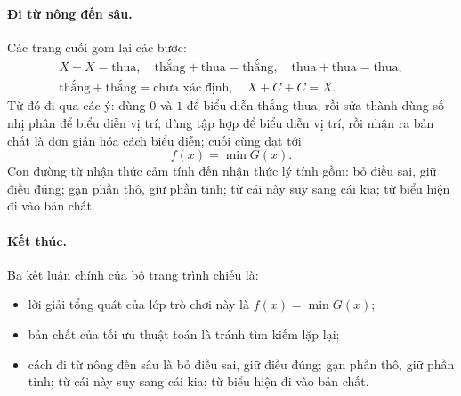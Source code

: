 \documentclass[11pt]{article}
\begin{document}
\paragraph{Đi từ nông đến sâu.}
Các trang cuối gom lại các bước:
\[
\begin{array}{c}
X+X=\text{thua},\quad
\text{thắng}+\text{thua}=\text{thắng},\quad
\text{thua}+\text{thua}=\text{thua},\\
\text{thắng}+\text{thắng}=\text{chưa xác định},\quad
X+C+C=X.
\end{array}
\]
Từ đó đi qua các ý: dùng \(0\) và \(1\) để biểu diễn thắng thua, rồi sửa
thành dùng số nhị phân để biểu diễn vị trí; dùng tập hợp để biểu diễn vị
trí, rồi nhận ra bản chất là đơn giản hóa cách biểu diễn; cuối cùng đạt tới
\[
  f(x)=\min G(x).
\]
Con đường từ nhận thức cảm tính đến nhận thức lý tính gồm: bỏ điều sai, giữ
điều đúng; gạn phần thô, giữ phần tinh; từ cái này suy sang cái kia; từ biểu
hiện đi vào bản chất.

\paragraph{Kết thúc.}
Ba kết luận chính của bộ trang trình chiếu là:
\begin{itemize}
  \item lời giải tổng quát của lớp trò chơi này là \(f(x)=\min G(x)\);
  \item bản chất của tối ưu thuật toán là tránh tìm kiếm lặp lại;
  \item cách đi từ nông đến sâu là bỏ điều sai, giữ điều đúng; gạn phần thô,
  giữ phần tinh; từ cái này suy sang cái kia; từ biểu hiện đi vào bản chất.
\end{itemize}
\end{document}
